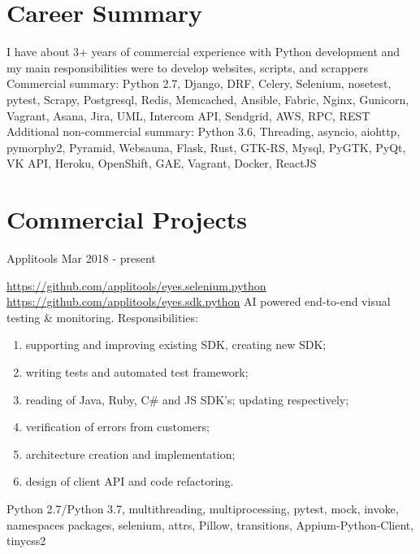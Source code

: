 \documentclass[11pt,a4paper]{moderncv}
\begin{document}
	\maketitle
	
	\section{Career Summary}
	\cvline
	{}
	{I have about 3+ years of commercial experience with Python development and my main responsibilities were to develop websites, scripts, and scrappers\newline{}\newline{}
	Commercial summary: Python 2.7, Django, DRF, Celery, Selenium, nosetest, pytest, Scrapy, Postgresql, Redis, Memcached, Ansible, Fabric, Nginx, Gunicorn, Vagrant, Asana, Jira, UML, Intercom API, Sendgrid, AWS, RPC, REST\newline{}\newline{}
	Additional non-commercial summary: Python 3.6, Threading, asyncio, aiohttp, pymorphy2, Pyramid, Websauna, Flask, Rust, GTK-RS, Mysql, PyGTK, PyQt, VK API, Heroku, OpenShift, GAE, Vagrant, Docker, ReactJS }
	

	\section{Commercial Projects}
	\cvline
	{Applitools Mar 2018 - present}
	{\url{https://github.com/applitools/eyes.selenium.python}\newline{}
	\url{https://github.com/applitools/eyes.sdk.python}\newline{}
	    AI powered end-to-end visual testing \& monitoring.\newline{}
        Responsibilities:
            \begin{enumerate}
                \item supporting and improving existing SDK, creating new SDK;
                \item writing tests and automated test framework;
                \item reading of Java, Ruby, C# and JS SDK's; updating respectively;
                \item verification of errors from customers;
                \item architecture creation and implementation;
                \item design of client API and code refactoring.
            \end{enumerate}
		\newline{}\newline{}
		Python 2.7/Python 3.7, multithreading, multiprocessing, pytest, mock, invoke, namespaces packages, selenium, attrs, Pillow, transitions, Appium-Python-Client, tinycss2}
\end{document}
